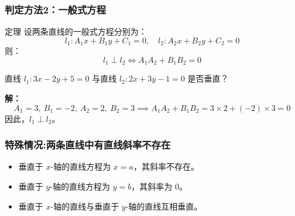 \begin{frame}
    \frametitle{判定方法2：一般式方程}
    \begin{block}{定理}
        设两条直线的一般式方程分别为：
        \[
        l_1: A_1x + B_1y + C_1 = 0, \quad l_2: A_2x + B_2y + C_2 = 0
        \]
        则：
        \[
        l_1 \perp l_2 \iff A_1A_2 + B_1B_2 = 0
        \]
    \end{block}

    \begin{example}
        直线 \( l_1: 3x - 2y + 5 = 0 \) 与直线 \( l_2: 2x + 3y - 1 = 0 \) 是否垂直？

        \textbf{解：}
        \[
        A_1 = 3, \ B_1 = -2, \ A_2 = 2, \ B_2 = 3 \implies A_1A_2 + B_1B_2 = 3 \times 2 + (-2) \times 3 = 0
        \]
        因此，\( l_1 \perp l_2 \)。
    \end{example}
\end{frame}





\begin{frame}
  \frametitle{特殊情况:两条直线中有直线斜率不存在}
  \begin{itemize}
      \item 垂直于 \( x \)-轴的直线方程为 \( x = a \)，其斜率不存在。
      \item 垂直于 \( y \)-轴的直线方程为 \( y = b \)，其斜率为 0。
      \item 垂直于 \( x \)-轴的直线与垂直于 \( y \)-轴的直线互相垂直。
  \end{itemize}

  \begin{center}
  \end{center}
\end{frame}
















